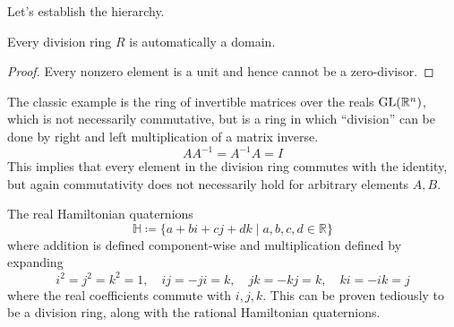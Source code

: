   Let's establish the hierarchy. 

  \begin{lemma}
    Every division ring $R$ is automatically a domain. 
  \end{lemma}
  \begin{proof}
    Every nonzero element is a unit and hence cannot be a zero-divisor. 
  \end{proof}

  \begin{example}
    The classic example is the ring of invertible matrices over the reals $\operatorname{GL}(\mathbb{R}^n)$, which is not necessarily commutative, but is a ring in which ``division'' can be done by right and left multiplication of a matrix inverse. 
    \begin{equation}
      A A^{-1} = A^{-1} A = I
    \end{equation}
    This implies that every element in the division ring commutes with the identity, but again commutativity does not necessarily hold for arbitrary elements $A, B$. 
  \end{example} 

  \begin{example}
    The real Hamiltonian quaternions 
    \begin{equation}
      \mathbb{H} \coloneqq \{a + bi + cj + dk \mid a, b, c, d \in \mathbb{R} \} 
    \end{equation}
    where addition is defined component-wise and multiplication defined by expanding 
    \begin{equation}
      i^2 = j^2 = k^2 = 1, \quad ij = -ji = k, \quad jk = -kj = k, \quad ki = -ik = j 
    \end{equation}
    where the real coefficients commute with $i, j, k$. This can be proven tediously to be a division ring, along with the rational Hamiltonian quaternions. 
  \end{example}

